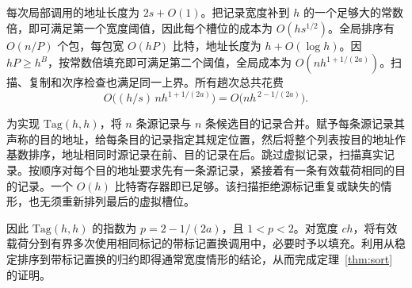 每次局部调用的地址长度为 $2s+O(1)$。把记录宽度补到 $h$ 的一个足够大的常数倍，即可满足第一个宽度阈值，因此每个槽位的成本为 $O(hs^{1/2})$。全局排序有 $O(n/P)$ 个包，每包宽 $O(hP)$ 比特，地址长度为 $h+O(\log h)$。因 $hP\ge h^B$，按常数倍填充即可满足第二个阈值，全局成本为 $O(nh^{1+1/(2a)})$。扫描、复制和次序检查也满足同一上界。所有趟次总共花费 \[
            O\bigl((h/s)\,nh^{1+1/(2a)}\bigr)
               =O\bigl(nh^{\,2-1/(2a)}\bigr).
\]

为实现 $\mathrm{Tag}(h,h)$，将 $n$ 条源记录与 $n$ 条候选目的记录合并。赋予每条源记录其声称的目的地址，给每条目的记录指定其规定位置，然后将整个列表按目的地址作基数排序，地址相同时源记录在前、目的记录在后。跳过虚拟记录，扫描真实记录。按顺序对每个目的地址要求先有一条源记录，紧接着有一条有效载荷相同的目的记录。一个 $O(h)$ 比特寄存器即已足够。该扫描拒绝源标记重复或缺失的情形，也无须重新排列最后的虚拟槽位。

因此 $\mathrm{Tag}(h,h)$ 的指数为 $p=2-1/(2a)$，且 $1<p<2$。对宽度 $ch$，将有效载荷分到有界多次使用相同标记的带标记置换调用中，必要时予以填充。利用从稳定排序到带标记置换的归约即得通常宽度情形的结论，从而完成定理~\ref{thm:sort} 的证明。
